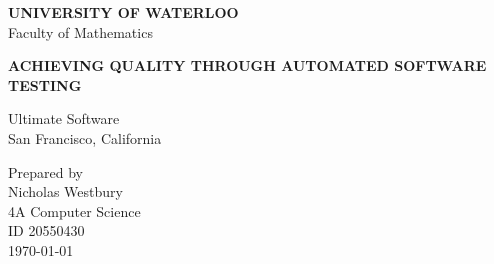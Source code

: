 \documentclass[12pt]{report}
\begin{document}
\begin{titlepage}
   \begin{center}
    	\normalsize \textbf{\uppercase{University of Waterloo}} \\
		Faculty of Mathematics \\
	\end{center}	
	\begin{center}
   		\LARGE \textbf{\uppercase{Achieving Quality through Automated Software Testing}}
	\end{center}
	\begin{center}
	   		\normalsize {Ultimate Software\\ San Francisco, California}	
	 
	\end{center}
	\begin{center}
	   		\normalsize {Prepared by\\
				Nicholas Westbury\\
				4A Computer Science\\
				ID 20550430\\
	   		 	\today
	   		 }
	\end{center}
\end{titlepage}
\end{document}

